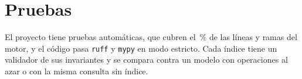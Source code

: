 \section{Pruebas}

El proyecto tiene \totalpruebas{} pruebas automáticas, que cubren el
\coberturapruebas{}\,\% de las líneas y ramas del motor, y el código pasa \texttt{ruff} y
\texttt{mypy} en modo estricto. Cada índice tiene un validador de sus invariantes y se
compara contra un modelo con operaciones al azar o con la misma consulta sin índice.
